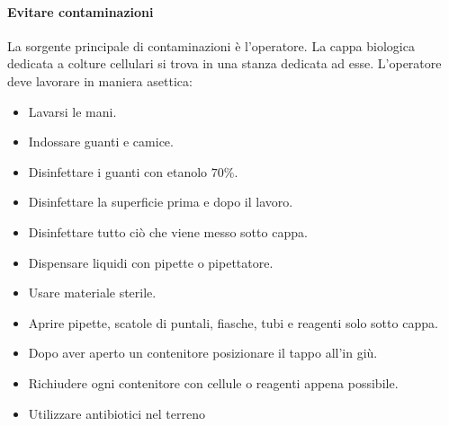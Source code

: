 			\paragraph{Evitare contaminazioni}
			La sorgente principale di contaminazioni \`e l'operatore.
			La cappa biologica dedicata a colture cellulari si trova in una stanza dedicata ad esse.
			L'operatore deve lavorare in maniera asettica:
			\begin{multicols}{2}
				\begin{itemize}
					\item Lavarsi le mani.
					\item Indossare guanti e camice.
					\item Disinfettare i guanti con etanolo $70\%$.
					\item Disinfettare la superficie prima e dopo il lavoro.
					\item Disinfettare tutto ci\`o che viene messo sotto cappa.
					\item Dispensare liquidi con pipette o pipettatore.
					\item Usare materiale sterile.
					\item Aprire pipette, scatole di puntali, fiasche, tubi e reagenti solo sotto cappa.
					\item Dopo aver aperto un contenitore posizionare il tappo all'in gi\`u.
					\item Richiudere ogni contenitore con cellule o reagenti appena possibile.
					\item Utilizzare antibiotici nel terreno
				\end{itemize}
			\end{multicols}

